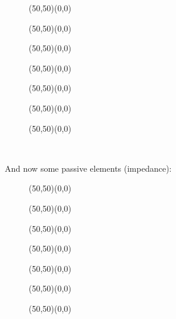 	\begin{figure}[H]
		\vspace{1cm}
		\begin{center}
		\begin{picture}(50,50)(0,0)
		\end{picture}
		\begin{picture}(50,50)(0,0)
		\end{picture}
		\begin{picture}(50,50)(0,0)
		\end{picture}
		\begin{picture}(50,50)(0,0)
		\end{picture}
		\begin{picture}(50,50)(0,0)
		\end{picture}
		\begin{picture}(50,50)(0,0)
		\end{picture}
		\begin{picture}(50,50)(0,0)
		\end{picture}
		\\[2cm]
		\end{center}
	\end{figure}
	
	And now some passive elements (impedance):
	\begin{figure}[H]
		\vspace{1cm}
		\begin{center}
		\begin{picture}(50,50)(0,0)
		\end{picture}
		\begin{picture}(50,50)(0,0)
		\end{picture}
		\begin{picture}(50,50)(0,0)
		\end{picture}
		\begin{picture}(50,50)(0,0)
		\end{picture}
		\begin{picture}(50,50)(0,0)
		\end{picture}
		\begin{picture}(50,50)(0,0)
		\end{picture}
		\begin{picture}(50,50)(0,0)
		\end{picture}
		\end{center}
	\end{figure}
	
